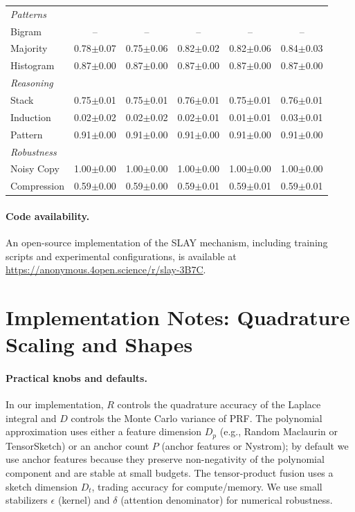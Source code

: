\documentclass{article}
\begin{document}
\begin{table}[t]
\begin{tabular}{lccccc}
\midrule
\multicolumn{6}{l}{\emph{Patterns}} \\
Bigram          & -- & -- & -- & -- & -- \\
Majority        & 0.78$\pm$0.07 & 0.75$\pm$0.06 & 0.82$\pm$0.02 & 0.82$\pm$0.06 & 0.84$\pm$0.03 \\
Histogram       & 0.87$\pm$0.00 & 0.87$\pm$0.00 & 0.87$\pm$0.00 & 0.87$\pm$0.00 & 0.87$\pm$0.00 \\
\midrule
\multicolumn{6}{l}{\emph{Reasoning}} \\
Stack           & 0.75$\pm$0.01 & 0.75$\pm$0.01 & 0.76$\pm$0.01 & 0.75$\pm$0.01 & 0.76$\pm$0.01 \\
Induction       & 0.02$\pm$0.02 & 0.02$\pm$0.02 & 0.02$\pm$0.01 & 0.01$\pm$0.01 & 0.03$\pm$0.01 \\
Pattern         & 0.91$\pm$0.00 & 0.91$\pm$0.00 & 0.91$\pm$0.00 & 0.91$\pm$0.00 & 0.91$\pm$0.00 \\
\midrule
\multicolumn{6}{l}{\emph{Robustness}} \\
Noisy Copy      & 1.00$\pm$0.00 & 1.00$\pm$0.00 & 1.00$\pm$0.00 & 1.00$\pm$0.00 & 1.00$\pm$0.00 \\
Compression     & 0.59$\pm$0.00 & 0.59$\pm$0.00 & 0.59$\pm$0.01 & 0.59$\pm$0.01 & 0.59$\pm$0.01 \\
\bottomrule
\end{tabular}
\end{table}

\paragraph{Code availability.}
An open-source implementation of the SLAY mechanism, including training scripts and experimental configurations, is available at
\url{https://anonymous.4open.science/r/slay-3B7C}.


\section{Implementation Notes: Quadrature Scaling and Shapes}
\label{app:impl}

\paragraph{Practical knobs and defaults.}
In our implementation, $R$ controls the quadrature accuracy of the Laplace integral and $D$ controls the Monte Carlo variance of PRF. The polynomial approximation uses either a feature dimension $D_p$ (e.g., Random Maclaurin or TensorSketch) or an anchor count $P$ (anchor features or Nystrom); by default we use anchor features because they preserve non-negativity of the polynomial component and are stable at small budgets.
The tensor-product fusion uses a sketch dimension $D_t$, trading accuracy for compute/memory. We use small stabilizers $\epsilon$ (kernel) and $\delta$ (attention denominator) for numerical robustness.
\end{document}
